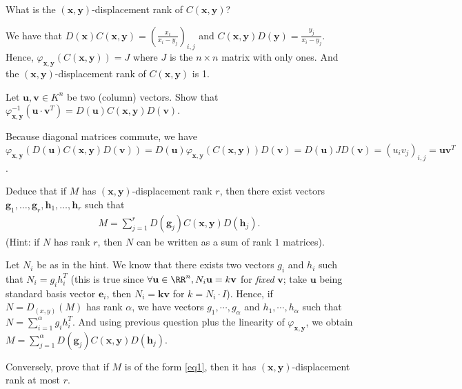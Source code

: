 \documentclass[11pt]{exam}
\theoremstyle{definition}
\newcommand{\vc}[1]{\mathbf{#1}}
\begin{document}
  \begin{questions}
    \question What is the $(\vc x, \vc y)$-displacement rank of $C(\vc x,\vc y)$?
    
    \begin{solution}
    	We have that $D(\vc x)C(\vc x,\vc y) = (\frac{x_i}{x_i-y_j})_{i,j}$ and $C(\vc x,\vc y)D(\vc y) = \frac{y_j}{x_i-y_j}$. Hence, $\varphi_{\mathbf{x,y}}(C(\vc x,\vc y)) = J$ where $J$ is the $n \times n$ matrix with only ones. And the $(\vc x ,\vc y)$-displacement rank of $C(\vc x,\vc y)$ is 1.
    \end{solution}

    \question Let $\vc u, \vc v \in K^n$ be two (column) vectors. Show that $\varphi^{-1}_{\vc x, \vc y}(\vc u\cdot \vc v^T)= D(\vc u)C(\vc x, \vc y)D(\vc v)$.
    
    	\begin{solution}
    	Because diagonal matrices commute, we have $\varphi_{\mathbf{x,y}}(D(\mathbf{u})C
    	(\mathbf{x,y})D(\mathbf{v})) = D(\vc u)\varphi_{\mathbf{x,y}}(C(\vc x,\vc y)) D(\vc v) = D(\vc u) J D(\vc v) = (u_iv_j)_{i,j} = \vc u \vc v^T$.
    \end{solution}

    \question Deduce that if $M$ has $(\vc x,\vc y)$-displacement rank $r$, then there exist vectors $\vc g_1,\dotsc, \vc g_{r},\vc h_1,\dotsc, \vc h_r$ such that
    \begin{align}\label{eq1} M = \sum_{j=1}^r D(\vc g_j)C(\vc x, \vc y)D(\vc h_j). \end{align}
    (Hint: if $N$ has rank $r$, then $N$ can be written as a sum of rank $1$ matrices).
    
    \begin{solution}
    	Let $N_i$ be as in the hint. We know that there exists two vectors $g_i$ and $h_i$ such that $N_i = g_ih_i^T$ (this is true since $\forall \vc u \in \RR^n, N_i \vc u = k \vc v$ for \emph{fixed} $\vc v$; take $\vc u$ being standard basis vector $\vc e_i$, then $N_i = \vc k \vc v$ for $k = N_i \cdot I$). Hence, if $N = D_{(x,y)}(M)$ has rank  $\alpha$, we have vectors $g_1, \cdots, g_\alpha$ and $h_1, \cdots, h_\alpha$ such that $N = \sum_{i = 1}^\alpha g_i h_i^T$. And using previous question plus the linearity of $\varphi_{\mathbf{x,y}}$, we obtain $M=\sum_{j=1}^{\alpha}D(\mathbf{g}_j)C(\mathbf{x,y})D(\mathbf{h}_j)$.
    \end{solution}

    \question Conversely, prove that if $M$ is of the form \eqref{eq1}, then it has $(\vc x,\vc y)$-displacement rank at most $r$.
    

\end{questions}
\end{document}
